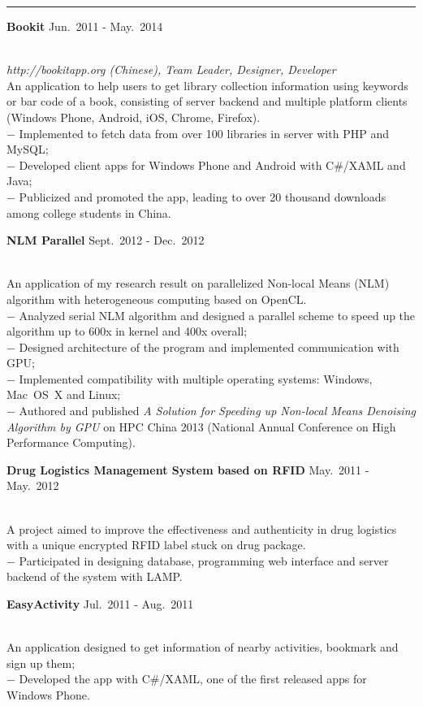 \documentclass[a4paper,10pt]{article}
\newcommand{\shadedsection}[1]{
    \setlength{\fboxsep}{0pt}
    \colorbox{shadecolor}{%
        \begin{minipage}{\linewidth}%
            \vspace{0.2em}%
            #1%
        \end{minipage}%
    }
}
\newenvironment{rSection}[1]{ %
  \medskip
  \hspace{-1.5em}{\color{Blue}\MakeUppercase{\large \bf {#1}}} %
  \vspace{-0.2em}
  \medskip
  \hrule %
  \begin{list}{}{ %
    \setlength{\leftmargin}{1.5em} %
  }
\setlength{\itemsep}{1pt}
  \item[]
}{
  \end{list}
}
\newcommand{\detail}[1]{{$-$ {#1}}}
\newcommand{\period}[3]{\normalsize {#1} \hfill {#2} - {#3}}
\begin{document}
\begin{rSection}{Relevant Projects}
  \vspace{-1.5em}
    
  \item
    \shadedsection{\period{\bf Bookit}{Jun.~2011}{May.~2014}}\\
    {\em http://bookitapp.org (Chinese), Team Leader, Designer, Developer}\\
    An application to help users to get library collection information using keywords or bar code of a book, consisting of server backend and multiple platform clients (Windows Phone, Android, iOS, Chrome, Firefox).\\
    \detail{Implemented to fetch data from over 100 libraries in server with PHP and MySQL;}\\
    \detail{Developed client apps for Windows Phone and Android with C\#/XAML and Java;}\\
    \detail{Publicized and promoted the app, leading to over 20 thousand downloads among college students in China.}
    
  \item
    \shadedsection{\period{\bf NLM Parallel}{Sept.~2012}{Dec.~2012}}\\
    An application of my research result on parallelized Non-local Means (NLM) algorithm with heterogeneous computing based on OpenCL.\\
    \detail{Analyzed serial NLM algorithm and designed a parallel scheme to speed up the algorithm up to 600x in kernel and 400x overall;}\\
    \detail{Designed architecture of the program and implemented communication with GPU;}\\
    \detail{Implemented compatibility with multiple operating systems: Windows, Mac~OS~X and Linux;}\\
    \detail{Authored and published {\em A Solution for Speeding up Non-local Means Denoising Algorithm by GPU} on HPC China 2013 (National Annual Conference on High Performance Computing).}
    
  \item
    \shadedsection{\period{\bf Drug Logistics Management System based on RFID}{May.~2011}{May.~2012}}\\
    A project aimed to improve the effectiveness and authenticity in drug logistics with a unique encrypted RFID label stuck on drug package.\\
    \detail{Participated in designing database, programming web interface and server backend of the system with LAMP.}

  \item
    \shadedsection{\period{\bf EasyActivity}{Jul.~2011}{Aug.~2011}}\\
    An application designed to get information of nearby activities, bookmark and sign up them;\\
    \detail{Developed the app with C\#/XAML, one of the first released apps for Windows Phone.}
\end{rSection}
\end{document}
